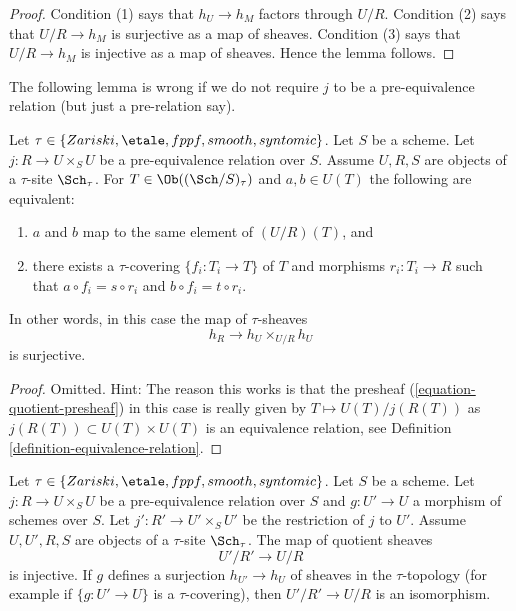 \begin{proof}
Condition (1) says that $h_U \to h_M$ factors through $U/R$.
Condition (2) says that $U/R \to h_M$ is surjective as a map of sheaves.
Condition (3) says that $U/R \to h_M$ is injective as a map of sheaves.
Hence the lemma follows.
\end{proof}

\noindent
The following lemma is wrong if we do not require $j$ to be a
pre-equivalence relation (but just a pre-relation say).

\begin{lemma}
\label{lemma-quotient-pre-equivalence}
Let $\tau \in \{Zariski, \etale, fppf, smooth, syntomic\}$.
Let $S$ be a scheme.
Let $j : R \to U \times_S U$ be a pre-equivalence relation over $S$.
Assume $U, R, S$ are objects of a $\tau$-site $\Sch_\tau$.
For $T \in \Ob((\Sch/S)_\tau)$ and
$a, b \in U(T)$ the following are equivalent:
\begin{enumerate}
\item $a$ and $b$ map to the same element of $(U/R)(T)$, and
\item there exists a $\tau$-covering $\{f_i : T_i \to T\}$ of $T$
and morphisms $r_i : T_i \to R$ such that
$a \circ f_i = s \circ r_i$ and $b \circ f_i = t \circ r_i$.
\end{enumerate}
In other words, in this case the map of $\tau$-sheaves
$$
h_R \longrightarrow h_U \times_{U/R} h_U
$$
is surjective.
\end{lemma}

\begin{proof}
Omitted. Hint: The reason this works is that the presheaf
(\ref{equation-quotient-presheaf}) in this case is really given
by $T \mapsto U(T)/j(R(T))$ as $j(R(T)) \subset U(T) \times U(T)$
is an equivalence relation, see
Definition \ref{definition-equivalence-relation}.
\end{proof}

\begin{lemma}
\label{lemma-quotient-pre-equivalence-relation-restrict}
Let $\tau \in \{Zariski, \etale, fppf, smooth, syntomic\}$.
Let $S$ be a scheme.
Let $j : R \to U \times_S U$ be a pre-equivalence relation over $S$
and $g : U' \to U$ a morphism of schemes over $S$.
Let $j' : R' \to U' \times_S U'$ be the restriction of $j$ to $U'$.
Assume  $U, U', R, S$ are objects of a $\tau$-site $\Sch_\tau$.
The map of quotient sheaves
$$
U'/R' \longrightarrow U/R
$$
is injective. If $g$ defines a surjection $h_{U'} \to h_U$ of sheaves
in the $\tau$-topology (for example if $\{g : U' \to U\}$ is a
$\tau$-covering), then $U'/R' \to U/R$ is an isomorphism.
\end{lemma}

